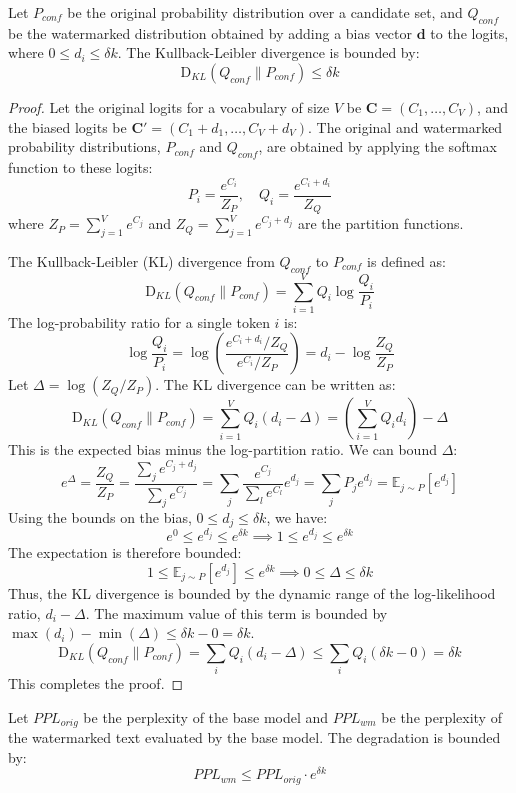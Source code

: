 \begin{theorem}
Let $P_{conf}$ be the original probability distribution over a candidate set, and $Q_{conf}$ be the watermarked distribution obtained by adding a bias vector $\mathbf{d}$ to the logits, where $0 \le d_i \le \delta k$. The Kullback-Leibler divergence is bounded by:
$$\mathrm{D}_{KL}(Q_{conf} \parallel P_{conf}) \le \delta k$$
\end{theorem}

\begin{proof}
Let the original logits for a vocabulary of size $V$ be $\mathbf{C} = (C_1, \dots, C_V)$, and the biased logits be $\mathbf{C'} = (C_1+d_1, \dots, C_V+d_V)$. The original and watermarked probability distributions, $P_{conf}$ and $Q_{conf}$, are obtained by applying the softmax function to these logits:
$$P_i = \frac{e^{C_i}}{Z_P}, \quad Q_i = \frac{e^{C_i+d_i}}{Z_Q}$$
where $Z_P = \sum_{j=1}^V e^{C_j}$ and $Z_Q = \sum_{j=1}^V e^{C_j+d_j}$ are the partition functions.

The Kullback-Leibler (KL) divergence from $Q_{conf}$ to $P_{conf}$ is defined as:
$$\mathrm{D}_{KL}(Q_{conf} \parallel P_{conf}) = \sum_{i=1}^V Q_i \log\frac{Q_i}{P_i}$$
The log-probability ratio for a single token $i$ is:
$$\log\frac{Q_i}{P_i} = \log\left(\frac{e^{C_i+d_i}/Z_Q}{e^{C_i}/Z_P}\right) = d_i - \log\frac{Z_Q}{Z_P}$$
Let $\Delta = \log(Z_Q/Z_P)$. The KL divergence can be written as:
$$\mathrm{D}_{KL}(Q_{conf} \parallel P_{conf}) = \sum_{i=1}^V Q_i (d_i - \Delta) = \left(\sum_{i=1}^V Q_i d_i\right) - \Delta$$
This is the expected bias minus the log-partition ratio. We can bound $\Delta$:
$$e^\Delta = \frac{Z_Q}{Z_P} = \frac{\sum_j e^{C_j+d_j}}{\sum_j e^{C_j}} = \sum_j \frac{e^{C_j}}{\sum_l e^{C_l}} e^{d_j} = \sum_j P_j e^{d_j} = \mathbb{E}_{j \sim P}[e^{d_j}]$$
Using the bounds on the bias, $0 \le d_j \le \delta k$, we have:
$$e^0 \le e^{d_j} \le e^{\delta k} \implies 1 \le e^{d_j} \le e^{\delta k}$$
The expectation is therefore bounded:
$$1 \le \mathbb{E}_{j \sim P}[e^{d_j}] \le e^{\delta k} \implies 0 \le \Delta \le \delta k$$
Thus, the KL divergence is bounded by the dynamic range of the log-likelihood ratio, $d_i - \Delta$. The maximum value of this term is bounded by $\max(d_i) - \min(\Delta) \le \delta k - 0 = \delta k$.
$$\mathrm{D}_{KL}(Q_{conf} \parallel P_{conf}) = \sum_i Q_i(d_i - \Delta) \le \sum_i Q_i(\delta k - 0) = \delta k$$
This completes the proof.
\end{proof}

\begin{theorem}
Let $PPL_{orig}$ be the perplexity of the base model and $PPL_{wm}$ be the perplexity of the watermarked text evaluated by the base model. The degradation is bounded by:
$$PPL_{wm} \le PPL_{orig} \cdot e^{\delta k}$$
\end{theorem}

